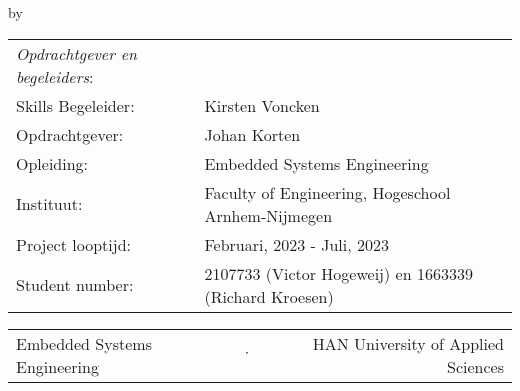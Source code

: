 \begin{titlepage}

\begin{center}

{\makeatletter
\largetitlestyle\fontsize{45}{45}\selectfont\@title
\makeatother}

\bigskip

{\makeatletter
\vspace{12mm}
\ifdefvoid{\@subtitle}{}{\largetitlestyle\fontsize{20}{20}\selectfont\@subtitle}
\makeatother}

\bigskip
\bigskip

by

\bigskip
\bigskip

{\makeatletter
\largetitlestyle\fontsize{25}{25}\selectfont\@author
\makeatother}

\bigskip
\bigskip



\vfill

\begin{tabular}{ll}
\textit{Opdrachtgever en begeleiders}:      & \\
Skills Begeleider:                          & Kirsten Voncken \\ 
Opdrachtgever:                    & Johan Korten \\
Opleiding:                          & Embedded Systems Engineering \\
Instituut:                          & Faculty of Engineering, Hogeschool Arnhem-Nijmegen\\
Project looptijd: & Februari, 2023 - Juli, 2023 \\
Student number: & 2107733 (Victor Hogeweij) en 1663339 (Richard Kroesen)\\
\end{tabular}

\vspace*{1cm}


\vspace*{2cm}
  \begin{center}
    \begin{tabular}{lcr}
      Embedded Systems Engineering & $\cdot$ & HAN University of Applied Sciences
    \end{tabular}
  \end{center}

\end{center}

\end{titlepage}
